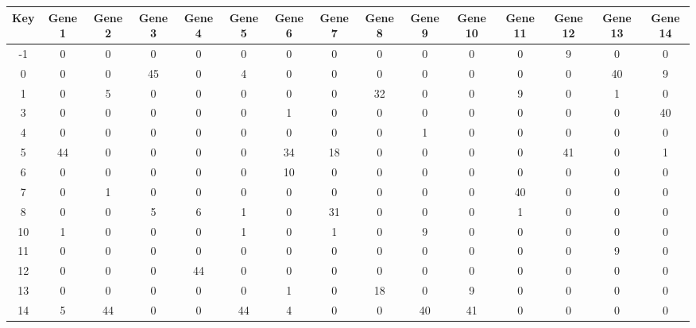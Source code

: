 \begin{tabular}{|c|c|c|c|c|c|c|c|c|c|c|c|c|c|c|}
\hline
Key & Gene 1 & Gene 2 & Gene 3 & Gene 4 & Gene 5 & Gene 6 & Gene 7 & Gene 8 & Gene 9 & Gene 10 & Gene 11 & Gene 12 & Gene 13 & Gene 14 \\
\hline
-1 & 0 & 0 & 0 & 0 & 0 & 0 & 0 & 0 & 0 & 0 & 0 & 9 & 0 & 0 \\
0 & 0 & 0 & 45 & 0 & 4 & 0 & 0 & 0 & 0 & 0 & 0 & 0 & 40 & 9 \\
1 & 0 & 5 & 0 & 0 & 0 & 0 & 0 & 32 & 0 & 0 & 9 & 0 & 1 & 0 \\
3 & 0 & 0 & 0 & 0 & 0 & 1 & 0 & 0 & 0 & 0 & 0 & 0 & 0 & 40 \\
4 & 0 & 0 & 0 & 0 & 0 & 0 & 0 & 0 & 1 & 0 & 0 & 0 & 0 & 0 \\
5 & 44 & 0 & 0 & 0 & 0 & 34 & 18 & 0 & 0 & 0 & 0 & 41 & 0 & 1 \\
6 & 0 & 0 & 0 & 0 & 0 & 10 & 0 & 0 & 0 & 0 & 0 & 0 & 0 & 0 \\
7 & 0 & 1 & 0 & 0 & 0 & 0 & 0 & 0 & 0 & 0 & 40 & 0 & 0 & 0 \\
8 & 0 & 0 & 5 & 6 & 1 & 0 & 31 & 0 & 0 & 0 & 1 & 0 & 0 & 0 \\
10 & 1 & 0 & 0 & 0 & 1 & 0 & 1 & 0 & 9 & 0 & 0 & 0 & 0 & 0 \\
11 & 0 & 0 & 0 & 0 & 0 & 0 & 0 & 0 & 0 & 0 & 0 & 0 & 9 & 0 \\
12 & 0 & 0 & 0 & 44 & 0 & 0 & 0 & 0 & 0 & 0 & 0 & 0 & 0 & 0 \\
13 & 0 & 0 & 0 & 0 & 0 & 1 & 0 & 18 & 0 & 9 & 0 & 0 & 0 & 0 \\
14 & 5 & 44 & 0 & 0 & 44 & 4 & 0 & 0 & 40 & 41 & 0 & 0 & 0 & 0 \\
\hline
\end{tabular}